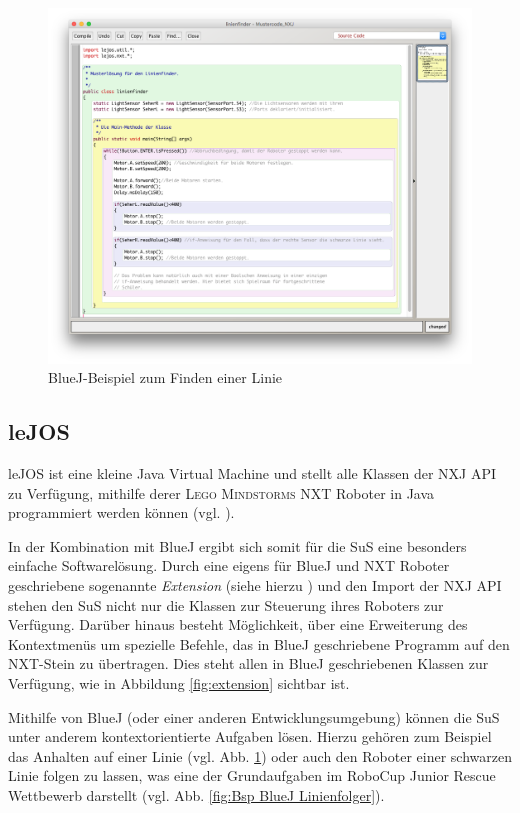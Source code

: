 \documentclass[paper=a4, DIV=calc, BCOR=12mm, twoside=on, onecolumn=on, open = right, titlepage =on, parskip =half-, headsepline = on, footsepline = off, chapterprefix = off, appendixprefix = on, fontsize = 12pt, numbers = noenddot, abstract = on]{scrbook}
\begin{document}
\begin{figure}[htb]
\centering
\includegraphics[width=\textwidth]{images/linienfinder_bluej.png} 
\caption{BlueJ-Beispiel zum Finden einer Linie}
\label{fig:Bsp BlueJ Linienfinder}
\end{figure}


\par \singlespacing
\subsection{leJOS}
\label{sec:lejos}
\onehalfspacing
leJOS ist eine kleine Java Virtual Machine und stellt alle Klassen der NXJ API zu Verfügung, mithilfe derer \textsc{Lego Mindstorms} NXT Roboter in Java programmiert werden können (vgl. \cite{lejos}).

In der Kombination mit BlueJ ergibt sich somit für die SuS eine besonders einfache Softwarelösung. Durch eine eigens für BlueJ und NXT Roboter geschriebene sogenannte \textit{Extension} (siehe hierzu \cite{bowes:12}) und den Import der NXJ API stehen den SuS nicht nur die Klassen zur Steuerung ihres Roboters zur Verfügung. Darüber hinaus besteht Möglichkeit, über eine Erweiterung des Kontextmenüs um spezielle Befehle, das in BlueJ geschriebene Programm auf den NXT-Stein zu übertragen. Dies steht allen in BlueJ geschriebenen Klassen zur Verfügung, wie in Abbildung \ref{fig:extension} sichtbar ist.


Mithilfe von BlueJ (oder einer anderen Entwicklungsumgebung) können die SuS unter anderem kontextorientierte Aufgaben lösen. Hierzu gehören zum Beispiel das Anhalten auf einer Linie (vgl. Abb. \ref{fig:Bsp BlueJ Linienfinder}) oder auch den Roboter einer schwarzen Linie folgen zu lassen, was eine der Grundaufgaben im RoboCup Junior Rescue Wettbewerb darstellt (vgl. Abb. \ref{fig:Bsp BlueJ Linienfolger}).
\end{document}
